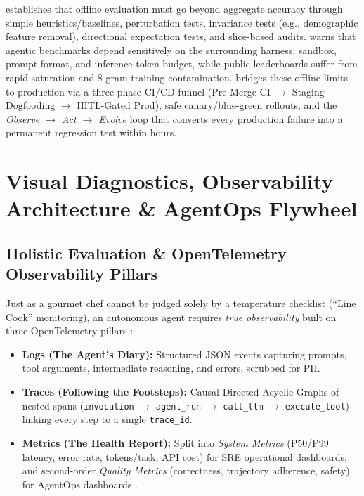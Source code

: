 \documentclass[../../../../master.tex]{subfiles}
\begin{document}
\begin{crossbook}
 establishes that offline evaluation must go beyond aggregate accuracy through simple heuristics/baselines, perturbation tests, invariance tests (e.g., demographic feature removal), directional expectation tests, and slice-based audits.  warns that agentic benchmarks depend sensitively on the surrounding harness, sandbox, prompt format, and inference token budget, while public leaderboards suffer from rapid saturation and 8-gram training contamination.  bridges these offline limits to production via a three-phase CI/CD funnel (Pre-Merge CI $\to$ Staging Dogfooding $\to$ HITL-Gated Prod), safe canary/blue-green rollouts, and the \emph{Observe $\to$ Act $\to$ Evolve} loop that converts every production failure into a permanent regression test within hours.
\end{crossbook}

\section{Visual Diagnostics, Observability Architecture \& AgentOps Flywheel}
\label{sec:ops:visuals}

\subsection{Holistic Evaluation \& OpenTelemetry Observability Pillars}
\label{sec:ops:otel}

Just as a gourmet chef cannot be judged solely by a temperature checklist (``Line Cook'' monitoring), an autonomous agent requires \emph{true observability} built on three OpenTelemetry pillars :
\begin{itemize}
  \item \textbf{Logs (The Agent's Diary):} Structured JSON events capturing prompts, tool arguments, intermediate reasoning, and errors, scrubbed for PII.
  \item \textbf{Traces (Following the Footsteps):} Causal Directed Acyclic Graphs of nested spans (\texttt{invocation} $\to$ \texttt{agent\_run} $\to$ \texttt{call\_llm} $\to$ \texttt{execute\_tool}) linking every step to a single \texttt{trace\_id}.
  \item \textbf{Metrics (The Health Report):} Split into \emph{System Metrics} (P50/P99 latency, error rate, tokens/task, API cost) for SRE operational dashboards, and second-order \emph{Quality Metrics} (correctness, trajectory adherence, safety) for AgentOps dashboards .
\end{itemize}
\end{document}
